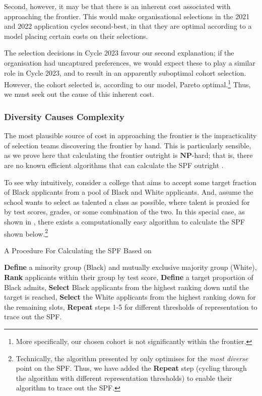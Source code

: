 Second, however, it may be that there is an inherent cost associated with approaching the frontier. This would make organisational selections in the 2021 and 2022 application cycles second-best, in that they are optimal according to a model placing certain costs on their selections. 

The selection decisions in Cycle 2023 favour our second explanation; if the organisation had uncaptured preferences, we would expect these to play a similar role in Cycle 2023, and to result in an apparently suboptimal cohort selection. However, the cohort selected is, according to our model, Pareto optimal.\footnote{More specifically, our chosen cohort is not significantly within the frontier.} Thus, we must seek out the cause of this inherent cost.

\subsubsection{Diversity Causes Complexity}\label{subsubsec:nphard}
The most plausible source of cost in approaching the frontier is the impracticality of selection teams discovering the frontier by hand. This is particularly sensible, as we prove here that calculating the frontier outright is $\mathbf{NP}$-hard; that is, there are no known efficient algorithms that can calculate the SPF outright \cite{COPPERSMITH198527}.

To see why intuitively, consider a college that aims to accept some target fraction of Black applicants from a pool of Black and White applicants. And, assume the school wants to select as talented a class as possible, where talent is proxied for by test scores, grades, or some combination of the two. In this special case, as shown in \textcite{kleinberg2018algorithmic}, there exists a computationally easy algorithm to calculate the SPF shown below.\footnote{Technically, the algorithm presented by \textcite{kleinberg2018algorithmic} only optimises for the \emph{most diverse} point on the SPF. Thus, we have added the \textbf{Repeat} step (cycling through the algorithm with different representation thresholds) to enable their algorithm to trace out the SPF.}

\begin{algorithm}
    \caption{A Procedure For Calculating the SPF Based on \textcite{kleinberg2018algorithmic}}\label{alg:kleinberg}
    \begin{algorithmic}
        \State \textbf{Define} a minority group (Black) and mutually exclusive majority group (White), 
        \State \textbf{Rank} applicants within their group by test score,
        \State \textbf{Define} a target proportion of Black admits,
        \State \textbf{Select} Black applicants from the highest ranking down until the target is reached,
        \State \textbf{Select} the White applicants from the highest ranking down for the remaining slots,
        \State \textbf{Repeat} steps 1-5 for different thresholds of representation to trace out the SPF.
    \end{algorithmic}
\end{algorithm}

